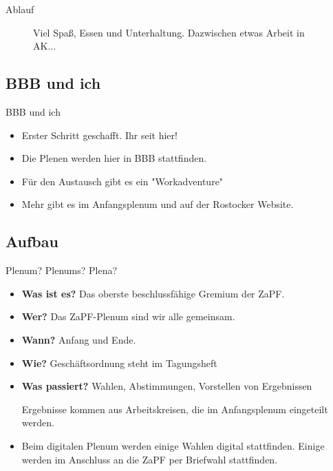 \documentclass[compress,]{beamer}
\begin{document}
\begin{frame}{Ablauf}
\begin{figure}
\begin{minipage}[b]{.45\linewidth}
   \end{minipage}
   \caption{Viel Spaß, Essen und Unterhaltung. Dazwischen etwas Arbeit in AK...}
\end{figure}

\end{frame}


\subsection{BBB und ich}
\begin{frame}{BBB und ich}
  \begin{itemize}[<+->]
  \item Erster Schritt geschafft. Ihr seit hier!
  \item Die Plenen werden hier in BBB stattfinden.
  \item Für den Austausch gibt es ein "Workadventure"
  \item Mehr gibt es im Anfangsplenum und auf der Rostocker Website.
  \end{itemize}

\end{frame}


\subsection{Aufbau}

\begin{frame}{Plenum? Plenums? Plena?}

  \begin{itemize}[<+->]
  \item \textbf{Was ist es?} Das oberste beschlussfähige Gremium der ZaPF.
  \item \textbf{Wer?} Das ZaPF-Plenum sind wir alle gemeinsam.
  \item \textbf{Wann?} Anfang und Ende.
  \item \textbf{Wie?} Geschäftsordnung steht im Tagungsheft
  \item \textbf{Was passiert?} Wahlen, Abstimmungen, Vorstellen von Ergebnissen

    Ergebnisse kommen aus Arbeitskreisen, die im Anfangsplenum eingeteilt werden.
  \item Beim digitalen Plenum werden einige Wahlen digital stattfinden. Einige werden im Anschluss an die ZaPF per Briefwahl stattfinden.  
  \end{itemize}


\end{frame}
\end{document}
